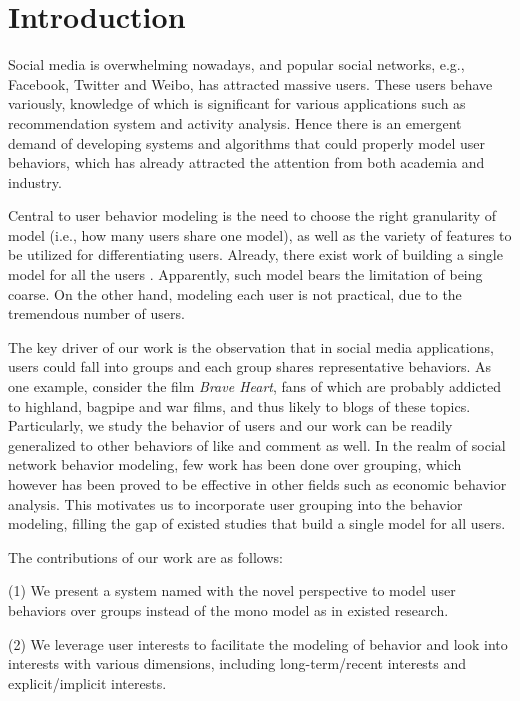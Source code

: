 \section{Introduction}
\label{sec:intro}

Social media is overwhelming nowadays, and popular social networks, e.g., Facebook, Twitter and Weibo, has attracted  massive users.
These users behave variously, knowledge of which is significant for various applications such as recommendation system and activity analysis.
Hence there is an emergent demand of developing systems and algorithms that could properly model user behaviors, which has already attracted the attention from both academia and industry.

Central to user behavior modeling is the need to choose the right granularity of model (i.e., how many users share one model), as well as the variety of features to be utilized for differentiating users.
Already, there exist work of building a single model for all the users \cite{IEEEexample:conf/wsdm/FengW13,IEEEexample:conf/ijcai/ZhangLTCL13,IEEEexample:journals/tkdd/ZhangTLLX15}.
Apparently, such model bears the limitation of being coarse.
On the other hand, modeling each user is not practical, due to the tremendous number of users.

The key driver of our work is the observation that in social media applications, users could fall into groups and each group shares representative behaviors.
%
As one example, consider the film \textit{Brave Heart}, fans of which are probably addicted to highland, bagpipe and war films, and thus likely to \ret{} blogs of these topics.
Particularly, we study the \retg{} behavior of users and our work can be readily generalized to other behaviors of like and comment as well.
In the realm of social network behavior modeling, few work has been done over grouping, which however has been proved to be effective in other fields such as economic behavior analysis.
This motivates us to incorporate user grouping into the \retg{} behavior modeling, filling the gap of existed studies that build a single model for all users.

The contributions of our work are as follows:

\stab(1) We present a system named \sys{} with the novel perspective to model user behaviors over groups instead of the mono model as in existed research.

\stab(2) We leverage user interests to facilitate the modeling of \retg{} behavior and look into interests with various dimensions, including long-term/recent interests and explicit/implicit interests.

